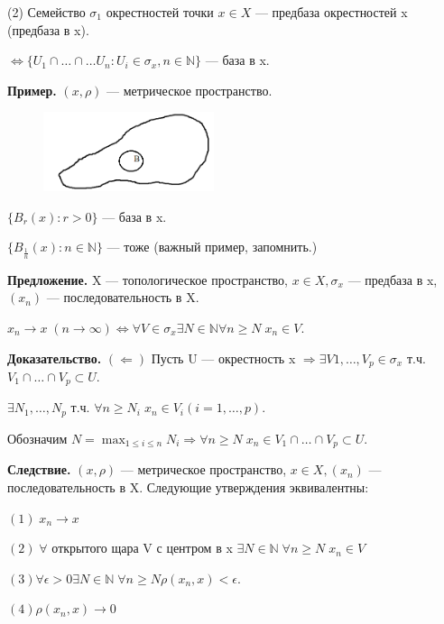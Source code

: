 \documentclass[12pt,a4paper]{article}
\begin{document}
(2) Семейство $\sigma_{1}$ окрестностей точки $x \in X$ --- предбаза окрестностей x (предбаза в x). 

$\Leftrightarrow \{U_{1} \cap \ldots \cap\ldots U_{n}: U_{i} \in \sigma_{x}, n \in \mathbb{N}\}$ --- база в x. 

\textbf{Пример.} $(x, \rho)$ --- метрическое пространство. 

\begin{figure}
	\includegraphics[width = 5cm]{lect3_4.png}
\end{figure}

$\{B_{r}(x): r > 0\}$ --- база в x. 

$\{B_{\frac{1}{n}}(x): n \in \mathbb{N}\}$ --- тоже (важный пример, запомнить.)

\textbf{Предложение.} X --- топологическое пространство, $x \in X, \sigma_{x}$ --- предбаза в x, $(x_{n})$ --- последовательность в X.

$x_{n} \to x \; (n \to \infty) \Leftrightarrow \forall V \in \sigma_{x} \exists N \in \mathbb{N} \forall n \geqslant N \; x_{n} \in V.$

\textbf{Доказательство.} $(\Leftarrow)$ Пусть U --- окрестность x $\Rightarrow \exists V{1}, \ldots, V_{p} \in \sigma_{x}$ т.ч. $V_{1} \cap \ldots \cap V_{p} \subset U.$ 

$\exists N_{1}, \ldots, N_{p}$ т.ч. $\forall n \geqslant N_{i} \; x_{n} \in V_{i} (i = 1, \ldots, p).$

Обозначим $N = \max_{1 \leqslant i \leqslant n} N_{i} \Rightarrow \forall n \geqslant N \; x_{n} \in V_{1} \cap \ldots \cap V_{p} \subset U.$ 


\textbf{Следствие.} $(x, \rho)$ --- метрическое пространство, $x \in X, (x_{n})$ --- последовательность в X. Следующие утверждения эквивалентны: 

$(1) \; x_{n} \to x$

$(2) \; \forall$ открытого щара V с центром в x $\exists N \in \mathbb{N} \; \forall n \geqslant N\; x_{n} \in V$

$(3) \forall \epsilon > 0 \exists N \in \mathbb{N} \; \forall n \geqslant N \rho(x_{n}, x) < \epsilon.$

$(4) \rho(x_{n}, x) \to 0$
\end{document}
